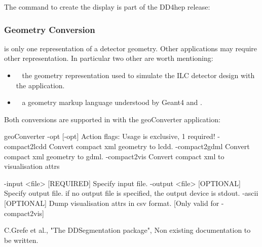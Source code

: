 \documentclass[10pt,a4paper]{article}
\begin{document}
\noindent
The command to create the display is part of the DD4hep release:

\subsubsection{Geometry Conversion}
\label{sec:dd4hep-manual-geometry-conversion}
\noindent
{}  is only one representation of a detector geometry.
Other applications may require other representation. In particular two other
are worth mentioning:
\begin{itemize}\itemcompact
\item {}~\cite{bib:LCDD} the geometry representation used to 
    simulate the ILC detector design with the  application.
\item {}~\cite{bib:GDML} a geometry markup language understood
    by Geant4 and .
\end{itemize}
Both conversions are supported in \DDhep with the geoConverter application:
\begin{code}
  geoConverter -opt [-opt]                                                
        Action flags:               Usage is exclusive, 1 required!           
        -compact2lcdd               Convert compact xml geometry to lcdd.     
        -compact2gdml               Convert compact xml geometry to gdml.     
        -compact2vis                Convert compact xml to visualisation attrs

        -input  <file>  [REQUIRED]  Specify input file.                       
        -output <file>  [OPTIONAL]  Specify output file.                      
                                    if no output file is specified, the output
                                    device is stdout.                         
        -ascii          [OPTIONAL]  Dump visualisation attrs in csv format.   
                                    [Only valid for -compact2vis]             
\end{code}

\newpage
\begin{thebibliography}{9}

 C.Grefe et al.,
                   "The DDSegmentation package", 
                   Non existing documentation to be written.
\end{thebibliography}
\end{document}
